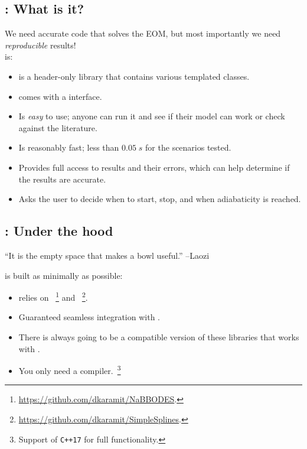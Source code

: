 \documentclass[10pt,utf8,compress,xcolor=dvipsnames]{beamer}
\begin{document}
\subsection{\mimes: What is it?}
\begin{frame}{\insertsubsectionhead}
	We need accurate code that solves the EOM, but most importantly we need {\sl reproducible} results! \\[0.2cm]
	
	\mimes is:
	\begin{itemize}
		\item \mimes is a \CPP header-only library that contains various templated classes. 
%		
		\item \mimes comes with a \PY interface.
%
		\item Is {\sl easy} to use; anyone can run it and see if their model can work or check against the literature.
%
		\item Is reasonably fast; less than $0.05 \; s$ for the scenarios tested.
%
		\item Provides full access to results and their errors, which can help determine if the results are accurate.
%
		\item Asks the user to decide when to start, stop, and when adiabaticity is reached.
	\end{itemize}
	
\end{frame}

\subsection{\mimes: Under the hood}
\begin{frame}{\insertsubsectionhead}
	\begin{center}
		``It is the empty space that makes a bowl useful.''
		\flushright --Laozi %
	\end{center}
	\mimes is built as minimally as possible:
	\\[0.3cm] 
	\begin{itemize}
		\item \mimes relies on ~\footnote{\fontF \href{https://github.com/dkaramit/NaBBODES}{https://github.com/dkaramit/NaBBODES}.} and ~\footnote{\fontF \href{https://github.com/dkaramit/SimpleSplines}{https://github.com/dkaramit/SimpleSplines}.}.
		\item Guaranteed seamless integration with \mimes.
		\item There is always going to be a compatible version of these libraries that works with \mimes.
		\item You only need a \CPP compiler.~\footnote{Support of {\tt C++17} for full functionality.}
	\end{itemize}	
		
\end{frame}
\end{document}
